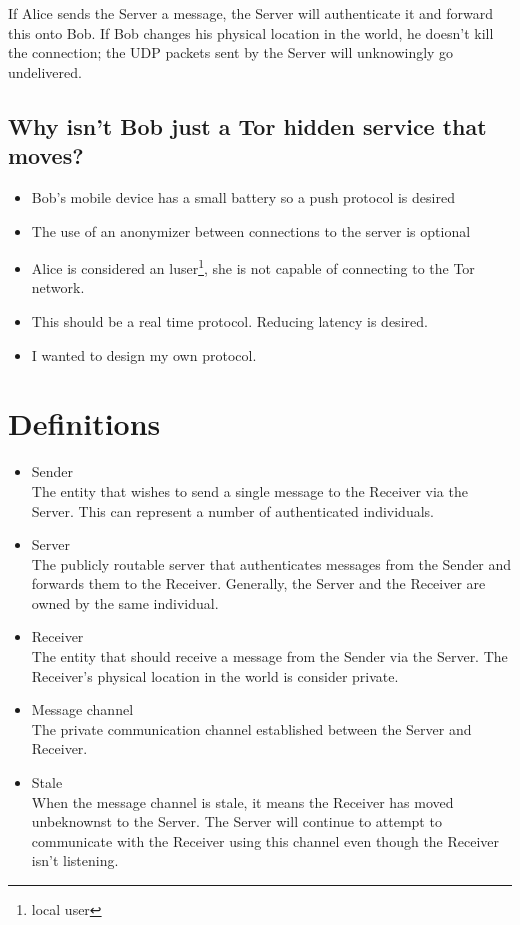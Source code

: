 \documentclass[11pt]{article}
\begin{document}
If Alice sends the Server a message, the Server will authenticate it and
forward this onto Bob. If Bob changes his physical location in the world, he
doesn't kill the connection; the UDP packets sent by the Server will
unknowingly go undelivered.

\subsection*{Why isn't Bob just a Tor hidden service that moves?}
\begin{itemize}
\item Bob's mobile device has a small battery so a push protocol is desired
\item The use of an anonymizer between connections to the server is optional
\item Alice is considered an luser\footnote{local user}, she is not capable
of connecting to the Tor network.
\item This should be a real time protocol. Reducing latency is desired.
\item I wanted to design my own protocol.
\end{itemize}

\pagebreak
\section*{Definitions}
\begin{itemize}
\item Sender \\
The entity that wishes to send a single message to the Receiver via the Server.
This can represent a number of authenticated individuals.
\item Server \\
The publicly routable server that authenticates messages from the Sender and
forwards them to the Receiver. Generally, the Server and the Receiver are
owned by the same individual.
\item Receiver \\
The entity that should receive a message from the Sender via the Server. The
Receiver's physical location in the world is consider private.
\item Message channel \\
The private communication channel established between the Server and Receiver.
\item Stale \\
When the message channel is stale, it means the Receiver has moved unbeknownst
to the Server. The Server will continue to attempt to communicate with the
Receiver using this channel even though the Receiver isn't listening.
\end{itemize}
\pagebreak
\end{document}
